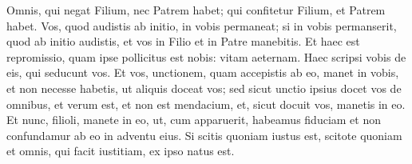 \begin{biblechapter}
\begin{biblechapter}
 \verse Omnis, qui negat Filium, nec Patrem habet; qui confitetur Filium, et Patrem habet.
 \verse Vos, quod audistis ab initio, in vobis permaneat; si in vobis permanserit, quod ab initio audistis, et vos in Filio et in Patre manebitis. 
\verse Et haec est repromissio, quam ipse pollicitus est nobis: vitam aeternam.
 \verse Haec scripsi vobis de eis, qui seducunt vos. 
\verse Et vos, unctionem, quam accepistis ab eo, manet in vobis, et non necesse habetis, ut aliquis doceat vos; sed sicut unctio ipsius docet vos de omnibus, et verum est, et non est mendacium, et, sicut docuit vos, manetis in eo.
 \verse Et nunc, filioli, manete in eo, ut, cum apparuerit, habeamus fiduciam et non confundamur ab eo in adventu eius. 
\verse Si scitis quoniam iustus est, scitote quoniam et omnis, qui facit iustitiam, ex ipso natus est.
 

\end{biblechapter}
\end{biblechapter}
